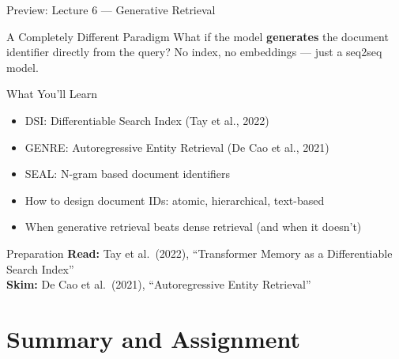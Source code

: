 \documentclass[aspectratio=169]{beamer}
\begin{document}
\begin{frame}{Preview: Lecture 6 --- Generative Retrieval}
\begin{block}{A Completely Different Paradigm}
What if the model \textbf{generates} the document identifier directly from the query? No index, no embeddings --- just a seq2seq model.
\end{block}

\vspace{0.5em}

\begin{exampleblock}{What You'll Learn}
\begin{itemize}
    \item DSI: Differentiable Search Index (Tay et al., 2022)
    \item GENRE: Autoregressive Entity Retrieval (De Cao et al., 2021)
    \item SEAL: N-gram based document identifiers
    \item How to design document IDs: atomic, hierarchical, text-based
    \item When generative retrieval beats dense retrieval (and when it doesn't)
\end{itemize}
\end{exampleblock}

\begin{alertblock}{Preparation}
\textbf{Read:} Tay et al.\ (2022), ``Transformer Memory as a Differentiable Search Index''\\
\textbf{Skim:} De Cao et al.\ (2021), ``Autoregressive Entity Retrieval''
\end{alertblock}
\end{frame}

\section{Summary and Assignment}

\begin{frame}[plain]
\sectionpage
\end{frame}
\end{document}
